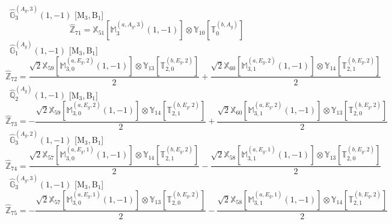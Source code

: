 \documentclass[fleqn,10pt,landscape]{article}
\begin{document}
\begin{itemize}
\begin{dmath*}
\end{dmath*}
\vspace{4mm}
\noindent {} $\,\,\,\hat{\mathbb{G}}_{3}^{(A_{g},3)}(1,-1)$ [M$_{3}$,\,B$_{1}$]
\begin{dmath*}
\hat{\mathbb{Z}}_{71}=\mathbb{X}_{51}[\mathbb{M}_{3}^{(a,A_{g},3)}(1,-1)] \otimes\mathbb{Y}_{10}[\mathbb{T}_{0}^{(b,A_{g})}]
\end{dmath*}
\vspace{4mm}
\noindent {} $\,\,\,\hat{\mathbb{G}}_{1}^{(A_{g})}(1,-1)$ [M$_{3}$,\,B$_{1}$]
\begin{dmath*}
\hat{\mathbb{Z}}_{72}=\frac{\sqrt{2} \mathbb{X}_{59}[\mathbb{M}_{3,0}^{(a,E_{g},2)}(1,-1)] \otimes\mathbb{Y}_{13}[\mathbb{T}_{2,0}^{(b,E_{g},2)}]}{2} + \frac{\sqrt{2} \mathbb{X}_{60}[\mathbb{M}_{3,1}^{(a,E_{g},2)}(1,-1)] \otimes\mathbb{Y}_{14}[\mathbb{T}_{2,1}^{(b,E_{g},2)}]}{2}
\end{dmath*}
\vspace{4mm}
\noindent {} $\,\,\,\hat{\mathbb{Q}}_{2}^{(A_{g})}(1,-1)$ [M$_{3}$,\,B$_{1}$]
\begin{dmath*}
\hat{\mathbb{Z}}_{73}=- \frac{\sqrt{2} \mathbb{X}_{59}[\mathbb{M}_{3,0}^{(a,E_{g},2)}(1,-1)] \otimes\mathbb{Y}_{14}[\mathbb{T}_{2,1}^{(b,E_{g},2)}]}{2} + \frac{\sqrt{2} \mathbb{X}_{60}[\mathbb{M}_{3,1}^{(a,E_{g},2)}(1,-1)] \otimes\mathbb{Y}_{13}[\mathbb{T}_{2,0}^{(b,E_{g},2)}]}{2}
\end{dmath*}
\vspace{4mm}
\noindent {} $\,\,\,\hat{\mathbb{G}}_{3}^{(A_{g},2)}(1,-1)$ [M$_{3}$,\,B$_{1}$]
\begin{dmath*}
\hat{\mathbb{Z}}_{74}=\frac{\sqrt{2} \mathbb{X}_{57}[\mathbb{M}_{3,0}^{(a,E_{g},1)}(1,-1)] \otimes\mathbb{Y}_{14}[\mathbb{T}_{2,1}^{(b,E_{g},2)}]}{2} - \frac{\sqrt{2} \mathbb{X}_{58}[\mathbb{M}_{3,1}^{(a,E_{g},1)}(1,-1)] \otimes\mathbb{Y}_{13}[\mathbb{T}_{2,0}^{(b,E_{g},2)}]}{2}
\end{dmath*}
\vspace{4mm}
\noindent {} $\,\,\,\hat{\mathbb{G}}_{3}^{(A_{g},3)}(1,-1)$ [M$_{3}$,\,B$_{1}$]
\begin{dmath*}
\hat{\mathbb{Z}}_{75}=- \frac{\sqrt{2} \mathbb{X}_{57}[\mathbb{M}_{3,0}^{(a,E_{g},1)}(1,-1)] \otimes\mathbb{Y}_{13}[\mathbb{T}_{2,0}^{(b,E_{g},2)}]}{2} - \frac{\sqrt{2} \mathbb{X}_{58}[\mathbb{M}_{3,1}^{(a,E_{g},1)}(1,-1)] \otimes\mathbb{Y}_{14}[\mathbb{T}_{2,1}^{(b,E_{g},2)}]}{2}
\end{dmath*}
\vspace{4mm}

\end{itemize}
\end{document}
